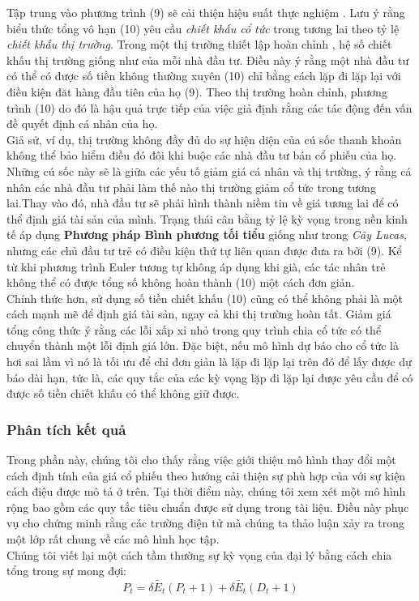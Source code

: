 \documentclass[10pt,a4paper]{article}
\begin{document}
	Tập trung vào phương trình (9) sẽ cải thiện hiệu suất thực nghiệm . Lưu ý rằng biểu thức tổng vô hạn (10) yêu cầu \textit{chiết khấu cổ tức }trong tương lai theo tỷ lệ \textit{chiết khấu thị trường}. Trong một thị trường thiết lập hoàn chỉnh , hệ số chiết khấu thị trường giống như của mỗi nhà đầu tư. Điều này ý rằng một nhà đầu tư có thể có được số tiền không thường xuyên (10) chỉ bằng cách lặp đi lặp lại với điều kiện đăt hàng đầu tiên của họ (9). Theo thị trường hoàn chỉnh, phương trình (10) do đó là hậu quả trực tiếp của việc giả định rằng các tác động đến vấn đề quyết định cá nhân của họ.\\
	Giả sử, ví dụ, thị trường không đầy đủ do sự hiện diện của cú sốc thanh khoản không thể bảo hiểm
	điều đó đôi khi buộc các nhà đầu tư bán cổ phiếu của họ. Những cú sốc này sẽ là giữa các yếu tố giảm giá cá nhân và thị trường, ý rằng cá nhân các nhà đầu tư phải làm thế nào thị trường giảm cổ tức trong tương lai.Thay vào đó, nhà đầu tư sẽ phải hình thành niềm tin về giá tương lai để có thể định giá tài sản của mình. 
	Trạng thái cân bằng tỷ lệ kỳ vọng trong nền kinh tế áp dụng\textbf{ Phương pháp Bình phương tối tiểu} giống như trong \textit{Cây Lucas}, nhưng các chủ đầu tư trẻ có điều kiện thứ tự liên quan được đưa ra bởi (9). Kể từ khi phương trình Euler tương tự không áp dụng khi già, các tác nhân trẻ không thể có được tổng số không hoàn thành (10) một cách đơn giản.\\
	Chính thức hơn, sử dụng số tiền chiết khấu (10) cũng có thể không phải là một cách mạnh mẽ để định giá tài sản, ngay cả khi thị trường hoàn tất. Giảm giá tổng công thức ý rằng các lỗi xấp xỉ nhỏ trong quy trình chia cổ tức có thể chuyển thành một lỗi định giá lớn. Đặc biệt, nếu mô hình dự báo cho cổ tức là hơi sai lầm vì nó là tối ưu để chỉ đơn giản là lặp đi lặp lại trên đó để lấy được
	dự báo dài hạn, tức là, các quy tắc của các kỳ vọng lặp đi lặp lại được yêu cầu để có được số tiền chiết khấu có thể không giữ được. 
	\subsubsection{Phân tích kết quả}
	
	Trong phần này, chúng tôi cho thấy rằng việc giới thiệu mô hình thay đổi một cách định tính của giá cổ phiếu theo hướng cải thiện sự phù hợp của với sự kiện cách điệu được mô tả ở trên. Tại thời điểm này, chúng tôi xem xét một mô hình  rộng bao gồm các quy tắc tiêu chuẩn được sử dụng trong tài liệu. Điều này phục vụ cho chứng minh rằng các trường điện tử mà chúng ta thảo luận xảy ra trong một lớp rất chung về các mô hình học tập.\\
	Chúng tôi viết lại một cách tầm thường sự kỳ vọng của đại lý bằng cách chia tổng
	trong sự mong đợi:
	\begin{equation}
	P_t=\delta\tilde{E_t}(P_t+1)+\delta\tilde{E_t}(D_t+1)
	\end{equation}
	
\end{document}
